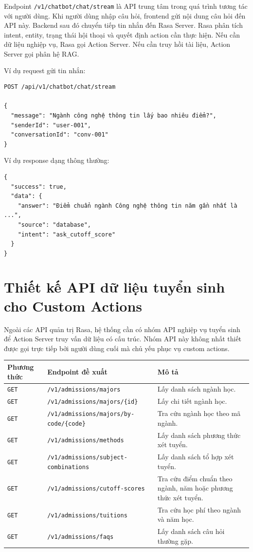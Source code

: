 \documentclass[12pt,a4paper]{report}
\begin{document}
Endpoint \texttt{/v1/chatbot/chat/stream} là API trung tâm trong quá trình tương tác với người dùng. Khi người dùng nhập câu hỏi, frontend gửi nội dung câu hỏi đến API này. Backend sau đó chuyển tiếp tin nhắn đến Rasa Server. Rasa phân tích intent, entity, trạng thái hội thoại và quyết định action cần thực hiện. Nếu cần dữ liệu nghiệp vụ, Rasa gọi Action Server. Nếu cần truy hồi tài liệu, Action Server gọi phân hệ RAG.

Ví dụ request gửi tin nhắn:

\begin{verbatim}
POST /api/v1/chatbot/chat/stream

{
  "message": "Ngành công nghệ thông tin lấy bao nhiêu điểm?",
  "senderId": "user-001",
  "conversationId": "conv-001"
}
\end{verbatim}

Ví dụ response dạng thông thường:

\begin{verbatim}
{
  "success": true,
  "data": {
    "answer": "Điểm chuẩn ngành Công nghệ thông tin năm gần nhất là ...",
    "source": "database",
    "intent": "ask_cutoff_score"
  }
}
\end{verbatim}

\section{Thiết kế API dữ liệu tuyển sinh cho Custom Actions}

Ngoài các API quản trị Rasa, hệ thống cần có nhóm API nghiệp vụ tuyển sinh để Action Server truy vấn dữ liệu có cấu trúc. Nhóm API này không nhất thiết được gọi trực tiếp bởi người dùng cuối mà chủ yếu phục vụ custom actions.

\begin{longtable}{|p{3cm}|p{5cm}|p{7cm}|}
\hline
\textbf{Phương thức} & \textbf{Endpoint đề xuất} & \textbf{Mô tả} \\
\hline
\texttt{GET} & \texttt{/v1/admissions/majors} & Lấy danh sách ngành học. \\
\hline
\texttt{GET} & \texttt{/v1/admissions/majors/\{id\}} & Lấy chi tiết ngành học. \\
\hline
\texttt{GET} & \texttt{/v1/admissions/majors/by-code/\{code\}} & Tra cứu ngành học theo mã ngành. \\
\hline
\texttt{GET} & \texttt{/v1/admissions/methods} & Lấy danh sách phương thức xét tuyển. \\
\hline
\texttt{GET} & \texttt{/v1/admissions/subject-combinations} & Lấy danh sách tổ hợp xét tuyển. \\
\hline
\texttt{GET} & \texttt{/v1/admissions/cutoff-scores} & Tra cứu điểm chuẩn theo ngành, năm hoặc phương thức xét tuyển. \\
\hline
\texttt{GET} & \texttt{/v1/admissions/tuitions} & Tra cứu học phí theo ngành và năm học. \\
\hline
\texttt{GET} & \texttt{/v1/admissions/faqs} & Lấy danh sách câu hỏi thường gặp. \\
\hline
\end{longtable}
\end{document}
